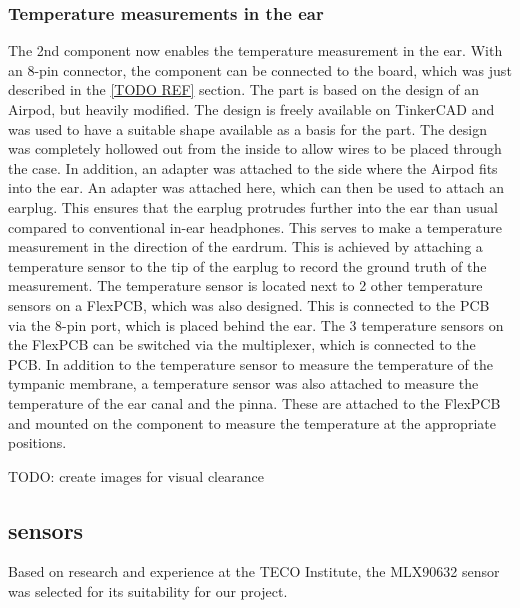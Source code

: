 \subsubsection{Temperature measurements in the ear}

The 2nd component now enables the temperature measurement in the ear.
With an 8-pin connector, the component can be connected to the board, which was just described in the \ref{TODO REF} section.
The part is based on the design of an Airpod, but heavily modified.
The design is freely available on TinkerCAD and was used to have a suitable shape available as a basis for the part.
The design was completely hollowed out from the inside to allow wires to be placed through the case.
In addition, an adapter was attached to the side where the Airpod fits into the ear. 
An adapter was attached here, which can then be used to attach an earplug.
This ensures that the earplug protrudes further into the ear than usual compared to conventional in-ear headphones.
This serves to make a temperature measurement in the direction of the eardrum. 
This is achieved by attaching a temperature sensor to the tip of the earplug to record the ground truth of the measurement. 
The temperature sensor is located next to 2 other temperature sensors on a FlexPCB, which was also designed.
This is connected to the PCB via the 8-pin port, which is placed behind the ear.
The 3 temperature sensors on the FlexPCB can be switched via the multiplexer, which is connected to the PCB.
In addition to the temperature sensor to measure the temperature of the tympanic membrane, a temperature sensor was also attached to measure the temperature of the ear canal and the pinna. 
These are attached to the FlexPCB and mounted on the component to measure the temperature at the appropriate positions.

TODO: create images for visual clearance

\subsection{sensors}

Based on research and experience at the TECO Institute, the MLX90632 sensor was selected for its suitability for our project.

